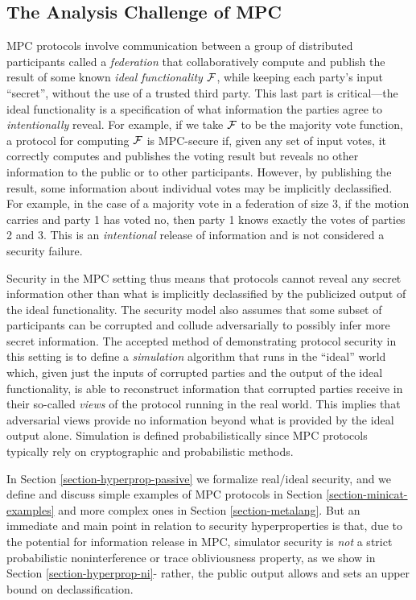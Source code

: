 \subsection{The Analysis Challenge of MPC}
MPC protocols involve communication
between a group of distributed participants called a \emph{federation}
that collaboratively compute and publish the result of some known
\emph{ideal functionality} $\mathcal{F}$, while keeping each party's input
``secret'', without the use of a trusted third party. This last part
is critical---the ideal functionality is a specification of what
information the parties agree to \emph{intentionally} reveal. For
example, if we take $\mathcal{F}$ to be the majority vote
function, a protocol for computing $\mathcal{F}$ is MPC-secure if, given
any set of input votes, it correctly computes and publishes the voting
result but reveals no other information to the public or to other
participants. However, by publishing the result, some information
about individual votes may be implicitly declassified.  For example,
in the case of a majority vote in a federation of size 3, if the
motion carries and party 1 has voted no, then party 1 knows exactly
the votes of parties 2 and 3. This is an \emph{intentional} release
of information and is not considered a security failure.

Security in the MPC setting thus means that protocols cannot reveal
any secret information other than what is implicitly declassified by
the publicized output of the ideal functionality. The security model
also assumes that some subset of participants can be corrupted and
collude adversarially to possibly infer more secret information. The
accepted method of demonstrating protocol security in this setting is
to define a \emph{simulation} algorithm that runs in the ``ideal''
world which, given just the inputs of corrupted parties and the output
of the ideal functionality, is able to reconstruct information that
corrupted parties receive in their so-called \emph{views} of the
protocol running in the real world.  This implies that adversarial
views provide no information beyond what is provided by the ideal
output alone. Simulation is defined probabilistically since MPC
protocols typically rely on cryptographic and probabilistic methods.

In Section \ref{section-hyperprop-passive} we formalize real/ideal
security, and we define and discuss simple examples of MPC protocols
in Section \ref{section-minicat-examples} and more complex ones in
Section \ref{section-metalang}. But an immediate and main point in
relation to security hyperproperties is that, due to the potential for
information release in MPC, simulator security is \emph{not} a strict
probabilistic noninterference or trace obliviousness property, as we
show in Section \ref{section-hyperprop-ni}- rather, the public output
allows and sets an upper bound on declassification.

